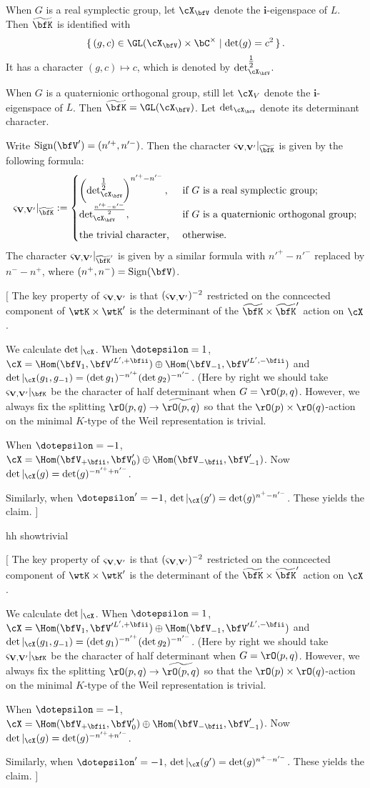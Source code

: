 \documentclass[12pt,a4paper]{amsart}
\newcommand{\trivial}[2][]{\if\relax\detokenize{#1}\relax
  {%
      \color{orange} \vspace{0em} $[$  #2 $]$
      \color{black}
  }
  \else
\ifx#1h
\ifcsname showtrivial\endcsname
{%
    \color{orange} \vspace{0em}  $[$ #2 $]$
    \color{black}
}
\fi
\else {\red Wrong argument!} \fi
\fi
}
\numberwithin{equation}{section}
\theoremstyle{remark}
\def\wtbfK{\widetilde{\bfK}}
\def\half{{\tfrac{1}{2}}}
\def\mktvvp{\varsigma_{{\bf V},{\bf V}'}}
\begin{document}
  When $G$ is a real symplectic group, let $\cX_{\bfV}$ denote the $\mathbf i$-eigenspace of
  $L$. Then $\wtbfK$ is identified with \[
    \set{(g,c)\in \GL(\cX_{\bfV})\times
      \bC^\times|\det(g) = c^2}.\]
  It has a %
  character
  $ (g,c)\mapsto c$, which is denoted by $\det_{\cX_{\bfV}}^{\half}$. %


  When $G$ is a quaternionic orthogonal group, still let
  $\cX_V$ denote the $\mathbf i$-eigenspace of $L$. Then $\wtbfK = \GL(\cX_{\bfV})$. Let $\det_{\cX_{\bfV}}$ denote its determinant character.

  Write $\sign{\bfV'} = (n'^+,n'^-)$. Then the character $\mktvvp|_{\wtbfK}$ is
  given by the following formula: %
  \[%
    \mktvvp|_{\wtbfK}:=\begin{cases}
      \left(\det_{\cX_{\bfV}}^{\half}\right)^{n'^+-n'^-} ,
      & \text{if  $G$ is a real symplectic group};\\
      \det_{\cX_{\bfV}}^{\frac{n'^+-n'^-}{2}},&  \text{if  $G$ is a quaternionic orthogonal group}; \medskip \\
      \textrm{the trivial character, } & \text{otherwise}.\\
    \end{cases}
  \]%
  The character $\mktvvp|_{\wtbfK'}$ is given by a similar formula
  with $n'^+-n'^-$ replaced by $n^--n^+$, where $(n^+, n^-)=\sign{\bfV}$.

  \trivial[h]{
    The key property of $\mktvvp$ is that $(\mktvvp)^{-2}$ restricted on the
    conncected component of $\wtK\times \wtK'$ is the determinant
    of the $\wtbfK\times \wtbfK'$ action on $\cX$.

    We calculate $\det|_\cX$. When $\dotepsilon = 1$, $\cX  = \Hom(\bfV_1,
    \bfV'^{L',+\bfii}) \oplus \Hom(\bfV_{-1},\bfV'^{L', -\bfii})$ and
    $\det|_{\cX}(g_1,g_{-1}) = (\det g_1)^{-n'^+}(\det g_2)^{-n'^-}$. (Here by
    right we should take $\mktvvp|_\bfK$ be the character of half
    determinant when $G = \rO(p,q)$.
    However, we always fix the splitting $\rO(p,q)\rightarrow
    \widetilde{\rO(p,q)}$ so that the $\rO(p)\times \rO(q)$-action
    on the minimal $K$-type of the Weil
    representation is trivial.

    When $\dotepsilon = -1$, $\cX = \Hom(\bfV_{+\bfii}, \bfV'_0)\oplus
    \Hom(\bfV_{-\bfii}, \bfV'_{-1})$. Now $\det|_{\cX}(g) = \det(g)^{-n'^+ +
      n'^-}$.

    Similarly, when $\dotepsilon' = -1$, $\det|_{\cX}(g') = \det(g)^{n^+ -
      n'^-}$.
    These yields the claim.
  }
\end{document}
